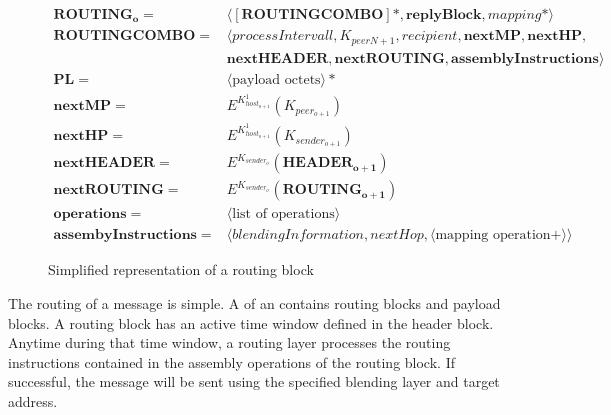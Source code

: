 \begin{figure}[!ht]
	\begin{align}
		\mathbf{ROUTING_o}           = & \langle [ \mathbf{ROUTINGCOMBO} ] *, \mathbf{replyBlock},mapping* \rangle\\  
		\mathbf{ROUTINGCOMBO}        = & \langle processIntervall, K_{peerN+1}, recipient, \mathbf{nextMP}, \mathbf{nextHP}, \nonumber \\
		& \mathbf{nextHEADER}, \mathbf{nextROUTING}, \mathbf{assemblyInstructions} \rangle\\
		\mathbf{PL}                  = & \langle \text{payload octets} \rangle *\\ 
		\mathbf{nextMP}              = & E^{K^1_{host_{o+1}}} \left( K_{peer_{o+1}} \right)\\
		\mathbf{nextHP}              = & E^{K^1_{host_{o+1}}} \left( K_{sender_{o+1}} \right)\\
		\mathbf{nextHEADER}          = & E^{K_{sender_o}} \left( \mathbf{HEADER_{o+1}} \right)\\
		\mathbf{nextROUTING}         = & E^{K_{sender_o}} \left( \mathbf{ROUTING_{o+1}} \right)\\    
		\mathbf{operations}          = & \langle \text{list of operations} \rangle \\
		\mathbf{assembyInstructions} = & \langle  blendingInformation, nextHop, \langle \text{mapping operation} +\rangle \rangle
	\end{align}
	\caption{Simplified representation of a routing block}
	\label{fig:mathRoutingSimplified}
\end{figure}

The routing of a message is simple. A  of an  contains routing blocks and payload blocks. A routing block has an active time window defined in the header block. Anytime during that time window, a routing layer processes the routing instructions contained in the assembly operations of the routing block. If successful, the message will be sent using the specified blending layer and target address.

